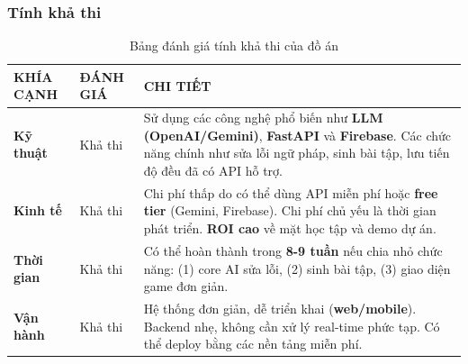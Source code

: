 \subsubsection{Tính khả thi}
\begin{table}[H]
    \centering %
    \renewcommand{\arraystretch}{1.6}
    
    \begin{tabularx}{0.9\textwidth}{|C|D|X|} %
        \hline
        \textbf{KHÍA CẠNH} & \textbf{ĐÁNH GIÁ} & \centering\arraybackslash \textbf{CHI TIẾT} \\ \hline
        
        \textbf{Kỹ thuật} & Khả thi & Sử dụng các công nghệ phổ biến như \textbf{LLM (OpenAI/Gemini)}, \textbf{FastAPI} và \textbf{Firebase}. Các chức năng chính như sửa lỗi ngữ pháp, sinh bài tập, lưu tiến độ đều đã có API hỗ trợ. \\ \hline
        
        \textbf{Kinh tế} & Khả thi & Chi phí thấp do có thể dùng API miễn phí hoặc \textbf{free tier} (Gemini, Firebase). Chi phí chủ yếu là thời gian phát triển. \textbf{ROI cao} về mặt học tập và demo dự án. \\ \hline
        
        \textbf{Thời gian} & Khả thi & Có thể hoàn thành trong \textbf{8-9 tuần} nếu chia nhỏ chức năng: (1) core AI sửa lỗi, (2) sinh bài tập, (3) giao diện game đơn giản. \\ \hline
        
        \textbf{Vận hành} & Khả thi & Hệ thống đơn giản, dễ triển khai (\textbf{web/mobile}). Backend nhẹ, không cần xử lý real-time phức tạp. Có thể deploy bằng các nền tảng miễn phí. \\ \hline
    \end{tabularx}
    \caption{Bảng đánh giá tính khả thi của đồ án}
    \label{tab:tinh-kha-thi}
\end{table}

